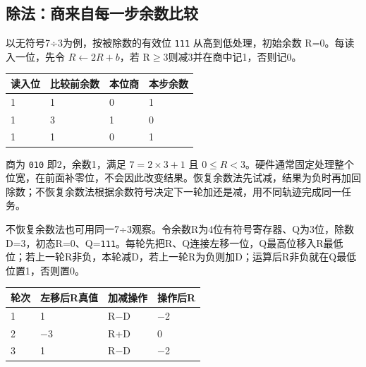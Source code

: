 \subsection{除法：商来自每一步余数比较}\label{CO02-17}

以无符号7÷3为例，按被除数的有效位 \texttt{111} 从高到低处理，初始余数 R=0。每读入一位，先令 \(R\leftarrow2R+b\)，若 R\ensuremath{\ge}3则减3并在商中记1，否则记0。

\begin{wideblock}\par\medskip\noindent\begin{minipage}{\linewidth}\fontsize{9.3}{12}\selectfont\begin{tabularx}{\linewidth}{@{}YYYY@{}}
\toprule\noalign{}
读入位 & 比较前余数 & 本位商 & 本步余数 \\
\midrule\noalign{}


1 & 1 & 0 & 1 \\
1 & 3 & 1 & 0 \\
1 & 1 & 0 & 1 \\
\bottomrule\end{tabularx}
\end{minipage}\par\medskip\end{wideblock}

商为 \texttt{010} 即2，余数1，满足 \(7=2\times3+1\) 且 \(0\le R<3\)。硬件通常固定处理整个位宽，在前面补零位，不会因此改变结果。恢复余数法先试减，结果为负时再加回除数；不恢复余数法根据余数符号决定下一轮加还是减，用不同轨迹完成同一任务。

不恢复余数法也可用同一7÷3观察。令余数R为4位有符号寄存器、Q为3位，除数D=3，初态R=0、Q=\texttt{111}。每轮先把R、Q连接左移一位，Q最高位移入R最低位；若上一轮R非负，本轮减D，若上一轮R为负则加D；运算后R非负就在Q最低位置1，否则置0。

\begin{wideblock}\par\medskip\noindent\begin{minipage}{\linewidth}\fontsize{9.3}{12}\selectfont\begin{tabularx}{\linewidth}{@{}YYYY@{}}
\toprule\noalign{}
轮次 & 左移后R真值 & 加减操作 & 操作后R \\
\midrule\noalign{}


1 & 1 & R\ensuremath{-}D & \ensuremath{-}2 \\
2 & \ensuremath{-}3 & R+D & 0 \\
3 & 1 & R\ensuremath{-}D & \ensuremath{-}2 \\
\bottomrule\end{tabularx}
\end{minipage}\par\medskip\end{wideblock}


